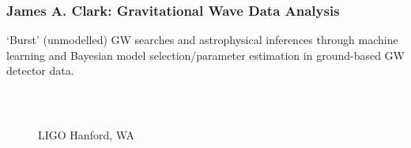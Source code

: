 \documentclass{beamer}
\begin{document}
\begin{frame}
    \frametitle{James A. Clark: Gravitational Wave Data Analysis}

            {\small `Burst' (unmodelled) GW searches and astrophysical inferences
            through machine learning and Bayesian model selection/parameter
        estimation in ground-based GW detector data.}

    \begin{columns}[]

        \begin{center}
            \vspace{-0.65cm}
            \begin{figure}
                 \\
                \caption{LIGO Hanford, WA}
            \end{figure}
        \end{center}




\end{columns}
\end{frame}
\end{document}
